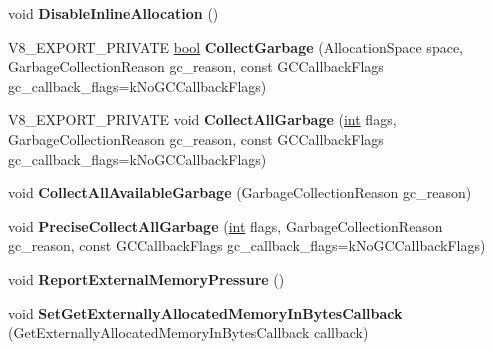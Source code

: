 \begin{DoxyCompactItemize}
\mbox{\label{classv8_1_1internal_1_1Heap_a95a38af1929db19530920772fb58386e}} 
void {\bfseries Disable\+Inline\+Allocation} ()
\item 
\mbox{\label{classv8_1_1internal_1_1Heap_a73d120d585bfe23f8e5ca5433422a892}} 
V8\+\_\+\+E\+X\+P\+O\+R\+T\+\_\+\+P\+R\+I\+V\+A\+TE \mbox{\hyperlink{classbool}{bool}} {\bfseries Collect\+Garbage} (Allocation\+Space space, Garbage\+Collection\+Reason gc\+\_\+reason, const G\+C\+Callback\+Flags gc\+\_\+callback\+\_\+flags=k\+No\+G\+C\+Callback\+Flags)
\item 
\mbox{\label{classv8_1_1internal_1_1Heap_aeec23f0301d5ccd4be7497630dc057b3}} 
V8\+\_\+\+E\+X\+P\+O\+R\+T\+\_\+\+P\+R\+I\+V\+A\+TE void {\bfseries Collect\+All\+Garbage} (\mbox{\hyperlink{classint}{int}} flags, Garbage\+Collection\+Reason gc\+\_\+reason, const G\+C\+Callback\+Flags gc\+\_\+callback\+\_\+flags=k\+No\+G\+C\+Callback\+Flags)
\item 
\mbox{\label{classv8_1_1internal_1_1Heap_a3dbe0c298eb537ec10028ff2054f7cbd}} 
void {\bfseries Collect\+All\+Available\+Garbage} (Garbage\+Collection\+Reason gc\+\_\+reason)
\item 
\mbox{\label{classv8_1_1internal_1_1Heap_ad84514d7e71d2b30a5de6ebe8fb5f627}} 
void {\bfseries Precise\+Collect\+All\+Garbage} (\mbox{\hyperlink{classint}{int}} flags, Garbage\+Collection\+Reason gc\+\_\+reason, const G\+C\+Callback\+Flags gc\+\_\+callback\+\_\+flags=k\+No\+G\+C\+Callback\+Flags)
\item 
\mbox{\label{classv8_1_1internal_1_1Heap_a4a916e869a974d30ce98bff19a58cba6}} 
void {\bfseries Report\+External\+Memory\+Pressure} ()
\item 
\mbox{\label{classv8_1_1internal_1_1Heap_a5b1acd1688cb79aeff776cb5d160ab8a}} 
void {\bfseries Set\+Get\+Externally\+Allocated\+Memory\+In\+Bytes\+Callback} (Get\+Externally\+Allocated\+Memory\+In\+Bytes\+Callback callback)
\item 
\mbox{\label{classv8_1_1internal_1_1Heap_a3b7fee40f4550a5ae8c934ed8eba018c}} 

\end{DoxyCompactItemize}
